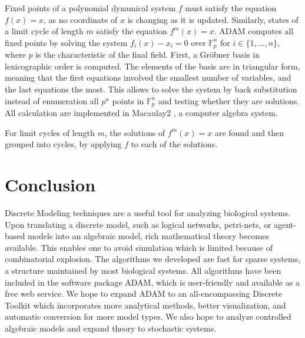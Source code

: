 \documentclass[11pt]{amsart}
\begin{document}
Fixed points of a polynomial dynamical system $f$ must satisfy the equation $f(x)
= x$, as no coordinate of $x$ is changing as it is updated. Similarly, states of a
limit cycle of length $m$ satisfy the equation $f^m(x) = x$. ADAM computes all
fixed points by solving the system $f_i(x) - x_i = 0$ over $\mathbb F_p^n$ for $i \in \{1, \ldots,
n\}$, where $p$ is the characteristic of the final field. First, a Gr\"obner
basis in lexicographic order is computed. The elements of the basis are in
triangular form, meaning that the first equations involved the smallest number
of variables, and the last equations the most. This allows to solve the system
by back substitution instead of enumeration all $p^n$ points in $\mathbb
F^n_p$ and testing whether they are solutions.
All calculation are implemented in Macaulay2 \cite{Macaulay2}, a
computer algebra system.

For limit cycles of length $m$, the solutions of $f^m(x)=x$ are found and then
grouped into cycles, by applying $f$ to each of the solutions.


\section{Conclusion}

Discrete Modeling techniques are a useful tool for analyzing biological
systems. Upon translating a discrete model, such as logical networks,
petri-nets, or agent-based models into an algebraic model, rich mathematical
theory becomes available. This enables one to
avoid simulation which is limited because of combinatorial explosion. The algorithms
we developed are fast for sparse systems, a structure maintained by most biological
systems. All algorithms have been included in the software package ADAM\cite{ADAM},
which is user-friendly and available as a free web service.
We hope to expand ADAM to an all-encompassing Discrete Toolkit which incorporates more
analytical methods, better visualization, and automatic conversion for more model types.
We also hope to analyze controlled algebraic models and expand theory to stochastic systems.
\end{document}
